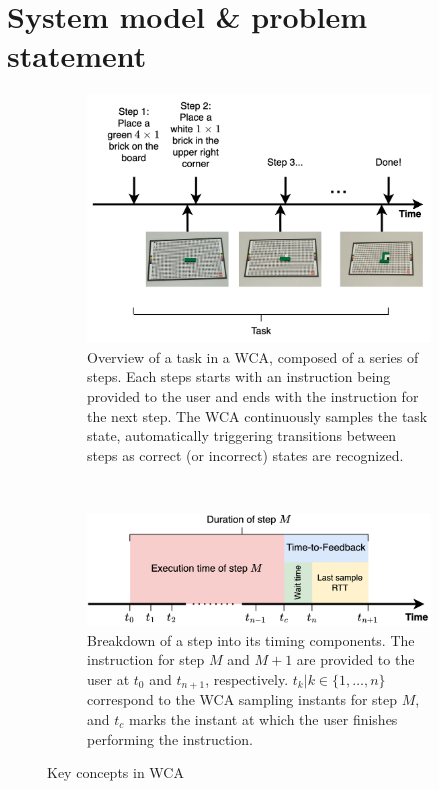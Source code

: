 \section{System model \& problem statement}

\begin{figure}
    \centering
    \begin{subfigure}{\columnwidth}
        \centering
        \includegraphics[width=.9\textwidth]{figs/task}
        \caption{%
            Overview of a task in a \gls{WCA}, composed of a series of steps.
            Each steps starts with an instruction being provided to the user and ends with the instruction for the next step.
            The \gls{WCA} continuously samples the task state, automatically triggering transitions between steps as correct (or incorrect) states are recognized.
        }\label{fig:task}
    \end{subfigure}\\
    \begin{subfigure}{\columnwidth}
        \centering
        \includegraphics[width=.9\textwidth]{figs/step_time}
        \caption{%
            Breakdown of a step into its timing components.
            The instruction for step \( M \) and \( M + 1 \) are provided to the user at \( t_0 \) and \( t_{n+1} \), respectively.
            \( t_k | k \in \{1, \ldots, n \} \) correspond to the \gls{WCA} sampling instants for step \( M \), and \( t_c \) marks the instant at which the user finishes performing the instruction.
        }\label{fig:step}
    \end{subfigure}
    \caption{Key concepts in \gls{WCA}}
\end{figure}

